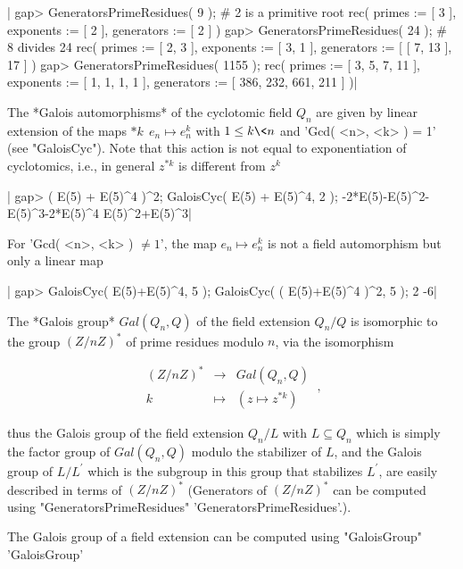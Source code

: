 |    gap> GeneratorsPrimeResidues( 9 );      # 2 is a primitive root
    rec(
      primes := [ 3 ],
      exponents := [ 2 ],
      generators := [ 2 ] )
    gap> GeneratorsPrimeResidues( 24 );     # 8 divides 24
    rec(
      primes := [ 2, 3 ],
      exponents := [ 3, 1 ],
      generators := [ [ 7, 13 ], 17 ] )
    gap> GeneratorsPrimeResidues( 1155 );
    rec(
      primes := [ 3, 5, 7, 11 ],
      exponents := [ 1, 1, 1, 1 ],
      generators := [ 386, 232, 661, 211 ] )|

%
%

The *Galois automorphisms* of the cyclotomic field $Q_n$ are given by
linear extension of the maps $\ast k\:\ e_n \mapsto e_n^k$ with
$1 \leq k \< n$ and 'Gcd( <n>, <k> ) = 1' (see "GaloisCyc").
Note that this action is not equal to exponentiation of cyclotomics,
i.e., in general $z^{\ast k}$ is different from $z^k$\:

|    gap> ( E(5) + E(5)^4 )^2; GaloisCyc( E(5) + E(5)^4, 2 );
    -2*E(5)-E(5)^2-E(5)^3-2*E(5)^4
    E(5)^2+E(5)^3|

For 'Gcd( <n>, <k> ) $\not= 1$', the map $e_n \mapsto e_n^k$ is not a
field automorphism but only a linear map\:

|    gap> GaloisCyc( E(5)+E(5)^4, 5 ); GaloisCyc( ( E(5)+E(5)^4 )^2, 5 );
    2
    -6|

The *Galois group* $Gal( Q_n, Q )$ of the field extension $Q_n/Q$ is
isomorphic to the group $(Z/nZ)^{\ast}$ of prime residues modulo $n$,
via the isomorphism

\[  \begin{array}{ccc} (Z/nZ)^{\ast} & \rightarrow & Gal( Q_n, Q ) \\
                        k        & \mapsto     & ( z \mapsto z^{\ast k} )
    \end{array} \ , \]

thus the Galois group of the field extension $Q_n / L$ with
$L \subseteq Q_n$ which is simply the factor group of $Gal( Q_n, Q )$
modulo the stabilizer of $L$, and the Galois group of $L/L^{\prime}$
which is the subgroup in this group that stabilizes $L^{\prime}$, are
easily described in terms of $(Z/nZ)^{\ast}$ (Generators of
$(Z/nZ)^{\ast}$ can be computed using "GeneratorsPrimeResidues"
'GeneratorsPrimeResidues'.).

The Galois group of a field extension can be computed using "GaloisGroup"
'GaloisGroup'\:

